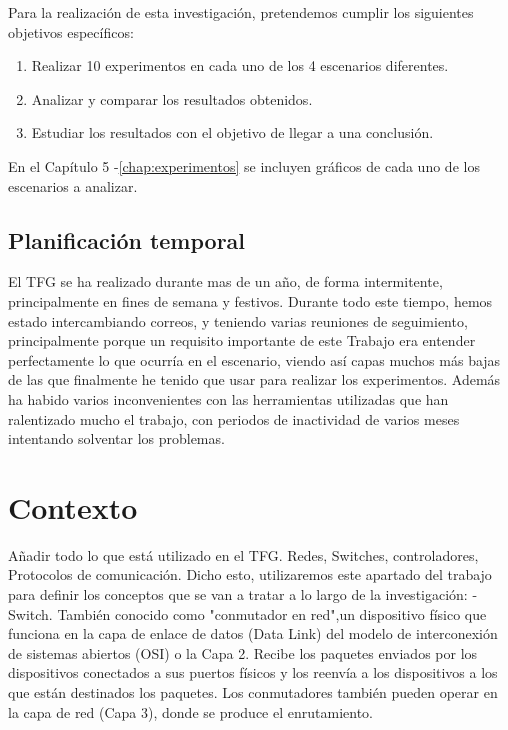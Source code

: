 \documentclass[a4paper, 12pt]{book}
\begin{document}
	Para la realización de esta investigación, pretendemos cumplir los siguientes objetivos específicos: 
	

	
	\begin{enumerate}
		\item 	Realizar 10 experimentos en cada uno de los 4 escenarios diferentes.
		\item  	Analizar y comparar los resultados obtenidos.
		\item 	Estudiar los resultados con el objetivo de llegar a una conclusión.
	\end{enumerate}
	
	En el Capítulo 5 -\ref{chap:experimentos} se incluyen gráficos de cada uno de los escenarios a analizar.
	

	
	\cleardoublepage
	\section{Planificación temporal}
	\label{sec:planificacion-temporal}
	
	El TFG se ha realizado durante mas de un año, de forma intermitente, principalmente en fines de semana y festivos. Durante todo este tiempo, hemos estado intercambiando correos, y teniendo varias reuniones de seguimiento, principalmente porque un requisito importante de este Trabajo era entender perfectamente lo que ocurría en el escenario, viendo así capas muchos más bajas de las que finalmente he tenido que usar para realizar los experimentos.
	Además ha habido varios inconvenientes con las herramientas utilizadas que han ralentizado mucho el trabajo, con periodos de inactividad de varios meses intentando solventar los problemas.
	
	
	
	\cleardoublepage
	\chapter{Contexto}
	\label{chap:estado}

	Añadir todo lo que está utilizado en el TFG. Redes, Switches, controladores, Protocolos de comunicación.
		Dicho esto, utilizaremos este apartado del trabajo para definir los conceptos que se van a tratar a lo largo de la investigación:
	- Switch. También conocido como "conmutador en red",un dispositivo físico que funciona en la capa de enlace de datos (Data Link) del modelo de interconexión de sistemas abiertos (OSI) o la Capa 2. Recibe los paquetes enviados por los dispositivos conectados a sus puertos físicos y los reenvía a los dispositivos a los que están destinados los paquetes. Los conmutadores también pueden operar en la capa de red (Capa 3), donde se produce el enrutamiento.
	
\end{document}

